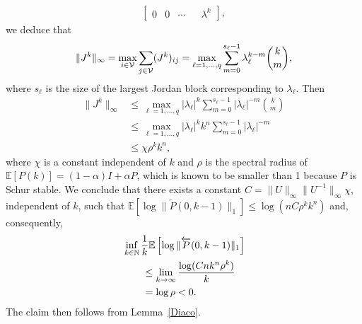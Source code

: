\documentclass{IEEEtran}
\def\Exp{\mathbb{E}}
\newcommand{\1}{\mathbf{1}} \newcommand{\ind}{\mathds{1}}
\begin{document}
\begin{IEEEproof}
\begin{align*}
\begin{bmatrix}
0 & 0 & \cdots  & & \lambda^k
\end{bmatrix},\end{align*}
we deduce that 
$$\|J^k\|_{\infty }=\max_{i\in \mathcal{V}}\sum_{j\in \mathcal{V}}(J^k)_{ij}= \max_{\ell=1, \dots, q}\sum_{m=0}^{s_\ell-1}\lambda_\ell^{k-m}{k\choose m},$$
where $s_\ell$ is the size of the largest  Jordan block corresponding to $\lambda_\ell.$
Then
\begin{align*}\|J^k\|_{\infty }&\leq \max_{\ell=1, \dots, q}|\lambda_\ell|^k\sum_{m=0}^{s_\ell-1}|\lambda_\ell|^{-m}{k\choose m}\\
&\leq\max_{\ell=1, \dots, q}|\lambda_\ell|^kk^{n}\sum_{m=0}^{s_\ell-1}|\lambda_\ell|^{-m}\\
&\leq \chi\rho^kk^{n},\end{align*}
where $\chi$ is a constant independent of $k$ and $\rho$ is the spectral radius of $\Exp[P(k)]=(1-\alpha)I+\alpha P$, which is known to be smaller than 1 because $P$ is Schur stable.
We conclude that there exists a constant $C=\|U\|_\infty \|U^{-1}\|_\infty \chi$, independent of $k$, such that 
$\Exp\left[\log\|\overleftarrow{P}(0,k-1)\|_{1}\right]\leq\log\left(nC\rho^kk^{n}\right)
$
and, consequently,
\begin{align}
\nonumber
&\inf_{k\in\N}\frac{1}{k}\Exp\left[\log\|\overleftarrow{P}(0,k-1)\|_{1}\right]\\
\label{eq:bound-for-Diaco}
&\qquad\leq\lim_{k\to\infty}\frac{\log(C n k^{n}\rho^k)}{k}\\
\nonumber&\qquad=\log\rho<0.
\end{align}
The claim then follows from Lemma~\ref{Diaco}.
\end{IEEEproof}
\end{document}

